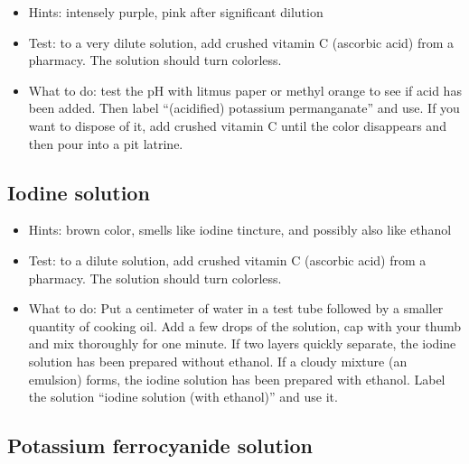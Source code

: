 \begin{itemize}

\item{Hints: intensely purple, 
pink after significant dilution}

\item{Test: to a very dilute solution, 
add crushed vitamin C (ascorbic acid) from a pharmacy. 
The solution should turn colorless.}

\item{What to do: test the pH with litmus paper 
or methyl orange to see if acid has been added. 
Then label ``(acidified) potassium permanganate'' and use. 
If you want to dispose of it, 
add crushed vitamin C until the color disappears 
and then pour into a pit latrine.}

\end{itemize}

\subsection{Iodine solution}

\begin{itemize}

\item{Hints: brown color, 
smells like iodine tincture, 
and possibly also like ethanol}

\item{Test: to a dilute solution, 
add crushed vitamin C (ascorbic acid) from a pharmacy. 
The solution should turn colorless.}

\item{What to do: Put a centimeter of water in a test tube 
followed by a smaller quantity of cooking oil. 
Add a few drops of the solution, 
cap with your thumb and mix thoroughly for one minute. 
If two layers quickly separate, 
the iodine solution has been prepared without ethanol. 
If a cloudy mixture (an emulsion) forms, 
the iodine solution has been prepared with ethanol. 
Label the solution ``iodine solution (with ethanol)'' and use it.}

\end{itemize}

\subsection{Potassium ferrocyanide solution}

